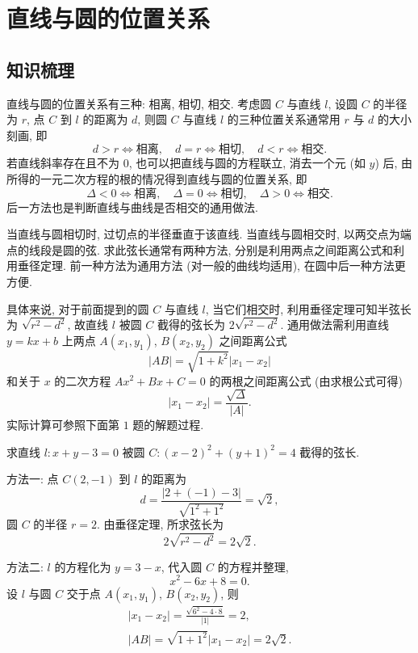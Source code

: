 
\section{直线与圆的位置关系}

\subsection{知识梳理}

直线与圆的位置关系有三种: 相离, 相切, 相交. 考虑圆 $C$ 与直线 $l$, 设圆 $C$ 的半径为 $r$, 点 $C$ 到 $l$ 的距离为 $d$, 则圆 $C$ 与直线 $l$ 的三种位置关系通常用 $r$ 与 $d$ 的大小刻画, 即
\[d>r\Leftrightarrow\text{相离},\quad 
    d=r\Leftrightarrow\text{相切},\quad 
    d<r\Leftrightarrow\text{相交}.\]
若直线斜率存在且不为 $0$, 也可以把直线与圆的方程联立, 消去一个元 (如 $y$) 后, 
由所得的一元二次方程的根的情况得到直线与圆的位置关系, 即
\[\Delta<0\Leftrightarrow\text{相离},\quad 
    \Delta=0\Leftrightarrow\text{相切},\quad 
    \Delta>0\Leftrightarrow\text{相交}.\] 
后一方法也是判断直线与曲线是否相交的通用做法.

当直线与圆相切时, 过切点的半径垂直于该直线. 当直线与圆相交时, 以两交点为端点的线段是圆的弦. 求此弦长通常有两种方法, 分别是利用两点之间距离公式和利用垂径定理. 前一种方法为通用方法 (对一般的曲线均适用), 在圆中后一种方法更方便.

具体来说, 对于前面提到的圆 $C$ 与直线 $l$, 当它们相交时, 利用垂径定理可知半弦长为 $\sqrt{r^2-d^2}$, 故直线 $l$ 被圆 $C$ 截得的弦长为 $2\sqrt{r^2-d^2}$. 通用做法需利用直线 $y=kx+b$ 上两点 $A(x_1,y_1)$, $B(x_2,y_2)$ 之间距离公式
\[|AB|= \sqrt{1+k^2} |x_1-x_2|\]
和关于 $x$ 的二次方程 $Ax^2+Bx+C=0$ 的两根之间距离公式 (由求根公式可得)
\[|x_1-x_2|= \frac{\sqrt{\Delta}}{|A|}.\]
实际计算可参照下面第 $1$ 题的解题过程.

\lianxi
\begin{exercise}
    求直线 $l\colon x+y-3=0$ 被圆 $C\colon (x-2)^2 +(y+1)^2 =4$ 截得的弦长.
\end{exercise}
\beginsolution
    方法一: 点 $C(2,-1)$ 到 $l$ 的距离为
    \[d= \frac{|2+(-1)-3|}{\sqrt{1^2+1^2}}= \sqrt2,\]
    圆 $C$ 的半径 $r=2$. 由垂径定理, 所求弦长为
    \[2\sqrt{r^2-d^2}= 2\sqrt2.\]

    方法二: $l$ 的方程化为 $y=3-x$, 代入圆 $C$ 的方程并整理,
    \[x^2-6x+8=0.\]
    设 $l$ 与圆 $C$ 交于点 $A(x_1,y_1)$, $B(x_2,y_2)$, 则
    \[\begin{gathered}
        |x_1-x_2|= \frac{\sqrt{6^2- 4\cdot 8}}{|1|}= 2,\\
        |AB|= \sqrt{1+1^2}|x_1-x_2|= 2\sqrt2.
    \end{gathered}\]
\endsolution

